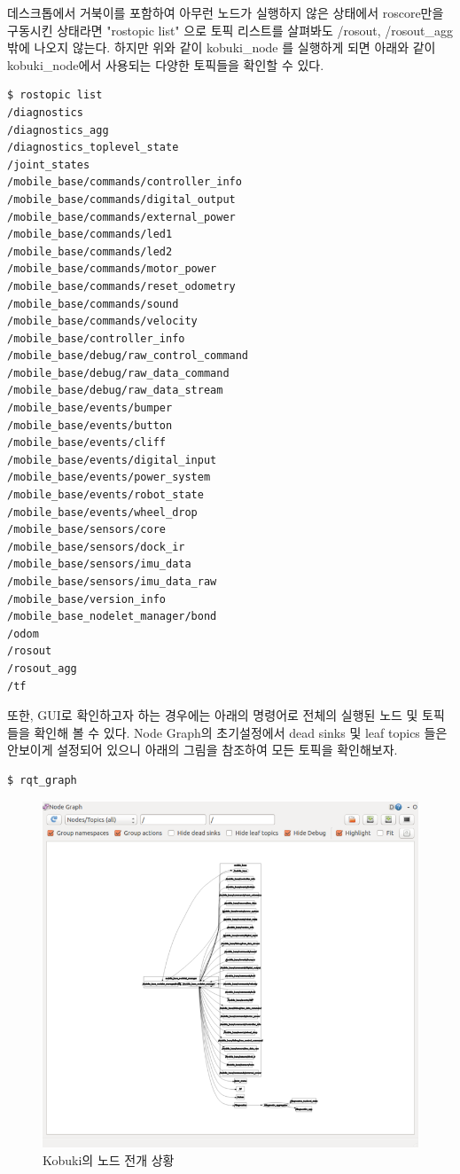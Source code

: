 데스크톱에서 거북이를 포함하여 아무런 노드가 실행하지 않은 상태에서 roscore만을 구동시킨 상태라면 "rostopic list" 으로 토픽 리스트를 살펴봐도 /rosout, /rosout\_agg 밖에 나오지 않는다. 하지만 위와 같이 kobuki\_node 를 실행하게 되면 아래와 같이 kobuki\_node에서 사용되는 다양한 토픽들을 확인할 수 있다.

\begin{lstlisting}[language=ROS]
$ rostopic list
/diagnostics
/diagnostics_agg
/diagnostics_toplevel_state
/joint_states
/mobile_base/commands/controller_info
/mobile_base/commands/digital_output
/mobile_base/commands/external_power
/mobile_base/commands/led1
/mobile_base/commands/led2
/mobile_base/commands/motor_power
/mobile_base/commands/reset_odometry
/mobile_base/commands/sound
/mobile_base/commands/velocity
/mobile_base/controller_info
/mobile_base/debug/raw_control_command
/mobile_base/debug/raw_data_command
/mobile_base/debug/raw_data_stream
/mobile_base/events/bumper
/mobile_base/events/button
/mobile_base/events/cliff
/mobile_base/events/digital_input
/mobile_base/events/power_system
/mobile_base/events/robot_state
/mobile_base/events/wheel_drop
/mobile_base/sensors/core
/mobile_base/sensors/dock_ir
/mobile_base/sensors/imu_data
/mobile_base/sensors/imu_data_raw
/mobile_base/version_info
/mobile_base_nodelet_manager/bond
/odom
/rosout
/rosout_agg
/tf
\end{lstlisting}

또한, GUI로 확인하고자 하는 경우에는 아래의 명령어로 전체의 실행된 노드 및 토픽들을 확인해 볼 수 있다. Node Graph의 초기설정에서 dead sinks 및 leaf topics 들은 안보이게 설정되어 있으니 아래의 그림을 참조하여 모든 토픽을 확인해보자.

\begin{lstlisting}[language=ROS]
$ rqt_graph
\end{lstlisting}

\begin{figure}[h]
\centering\includegraphics[width=0.5\columnwidth]{pictures/chapter10/rqt_graph_kobuki.png}
\caption{Kobuki의 노드 전개 상황}
\end{figure}

